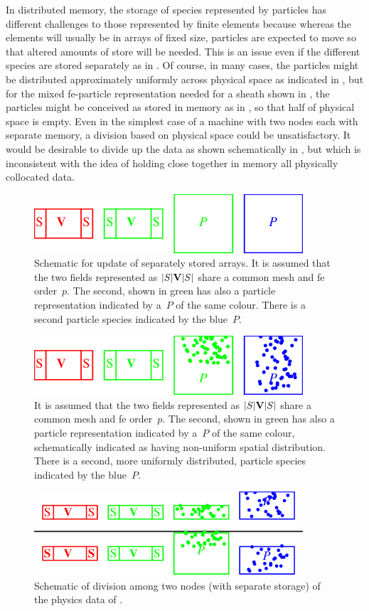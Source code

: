 In distributed memory, the storage of species represented by particles has different challenges to
those represented by finite elements because whereas the elements will usually be in arrays of fixed size,
particles are expected to move so that altered amounts of store will be needed.
This is an issue even if the different species are stored separately
as in .  Of course, in many cases, the particles might be distributed
approximately uniformly across physical space as indicated  in , but
for the mixed fe-particle representation needed for a sheath shown in ,
the particles might be conceived as stored in memory as in , so that
half of physical space is empty. Even in the simplest case of a machine with
two nodes each with separate memory, a division based on physical space could
be unsatisfactory. It would be desirable to divide up the data as shown
schematically in , but which is inconsistent with the idea of
holding close together in memory all physically collocated data.
\begin{figure}
\centerline{\includegraphics[width=10cm]{../pics/fvfs.png}}
\caption{
Schematic for update of separately stored arrays.
It is assumed that the two fields represented as $|S|{\bf V}|S|$ share a common mesh
and fe order~$p$. The second, shown in green has also a particle representation
indicated by a~$P$ of the same colour. There is a second particle species
indicated by the blue~$P$.
\label{fig:fvfs}}
\end{figure}
\begin{figure}
\centerline{\includegraphics[width=10cm]{../pics/fvfspot.png}}
\caption{
It is assumed that the two fields represented as $|S|{\bf V}|S|$ share a common mesh
and fe order~$p$. The second, shown in green has also a particle representation
indicated by a~$P$ of the same colour, schematically indicated as having
non-uniform spatial distribution.
There is a second, more uniformly distributed, particle species
indicated by the blue~$P$.
\label{fig:fvfspot}}
\end{figure}
\begin{figure}
\centerline{\includegraphics[width=10cm]{../pics/fvfsplut.png}}
\caption{
Schematic of division among two nodes (with separate storage) of the physics data
of \protect{}.
\label{fig:fvfsplut}}
\end{figure}

